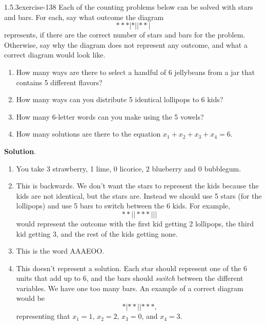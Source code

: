 \documentclass[twoside,11pt,]{book}
\numberwithin{equation}{chapter}
\begin{document}
\begin{divisionsolution}{1.5.3}{}{exercise-138}%
\hypertarget{p-2268}{}%
Each of the counting problems below can be solved with stars and bars. For each, say what outcome the diagram%
\begin{equation*}
***|*||**|
\end{equation*}
represents, if there are the correct number of stars and bars for the problem. Otherwise, say why the diagram does not represent any outcome, and what a correct diagram would look like.\leavevmode%
\begin{enumerate}[label=(\alph*)]
\item\hypertarget{li-1397}{}\hypertarget{p-2269}{}%
How many ways are there to select a handful of 6 jellybeans from a jar that contains 5 different flavors?%
\item\hypertarget{li-1398}{}\hypertarget{p-2270}{}%
How many ways can you distribute 5 identical lollipops to 6 kids?%
\item\hypertarget{li-1399}{}\hypertarget{p-2271}{}%
How many 6-letter words can you make using the 5 vowels?%
\item\hypertarget{li-1400}{}\hypertarget{p-2272}{}%
How many solutions are there to the equation \(x_1 + x_2 + x_3 + x_4 = 6\).%
\end{enumerate}
%
\par\smallskip%
\noindent\textbf{Solution}.\quad%
\hypertarget{p-2273}{}%
\leavevmode%
\begin{enumerate}[label=(\alph*)]
\item\hypertarget{li-1401}{}\hypertarget{p-2274}{}%
You take 3 strawberry, 1 lime, 0 licorice, 2 blueberry and 0 bubblegum.%
\item\hypertarget{li-1402}{}\hypertarget{p-2275}{}%
This is backwards. We don't want the stars to represent the kids because the kids are not identical, but the stars are. Instead we should use 5 stars (for the lollipops) and use 5 bars to switch between the 6 kids. For example,%
\begin{equation*}
**||***|||
\end{equation*}
would represent the outcome with the first kid getting 2 lollipops, the third kid getting 3, and the rest of the kids getting none.%
\item\hypertarget{li-1403}{}\hypertarget{p-2276}{}%
This is the word AAAEOO.%
\item\hypertarget{li-1404}{}\hypertarget{p-2277}{}%
This doesn't represent a solution. Each star should represent one of the 6 units that add up to 6, and the bars should \emph{switch} between the different variables. We have one too many bars. An example of a correct diagram would be%
\begin{equation*}
*|**||***\text{,}
\end{equation*}
representing that \(x_1 = 1\), \(x_2 = 2\), \(x_3 = 0\), and \(x_4 = 3\).%
\end{enumerate}
%
\end{divisionsolution}%
\end{document}

